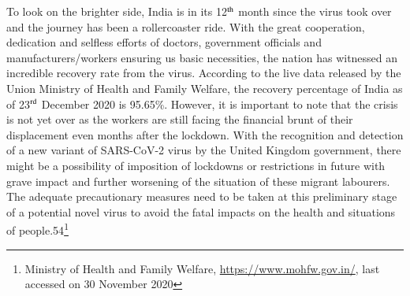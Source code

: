 \begin{multicols}{2}
\noi
To look on the brighter side, India is in its 12$^{\rm th}$ month since the virus took over and the
journey has been a rollercoaster ride. With the great cooperation, dedication and selfless
efforts of doctors, government officials and manufacturers/workers ensuring us basic
necessities, the nation has witnessed an incredible recovery rate from the virus. According to
the live data released by the Union Ministry of Health and Family Welfare, the recovery
percentage of India as of 23$^{\rm rd}$ December 2020 is 95.65\%. However, it is important to note that
the crisis is not yet over as the workers are still facing the financial brunt of their
displacement even months after the lockdown. With the recognition and detection of a new
variant of SARS-CoV-2 virus by the United Kingdom government, there might be a
possibility of imposition of lockdowns or restrictions in future with grave impact and further
worsening of the situation of these migrant labourers. The adequate precautionary measures
need to be taken at this preliminary stage of a potential novel virus to avoid the fatal impacts
on the health and situations of people.54\footnote{Ministry of Health and Family Welfare, \url{https://www.mohfw.gov.in/}, last accessed on 30 November 2020}


\end{multicols}
